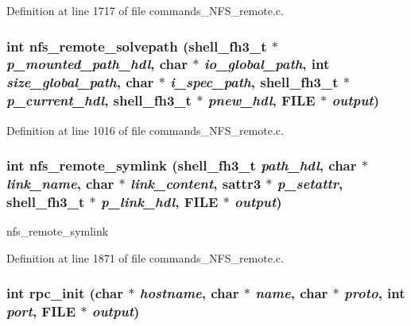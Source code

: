 Definition at line 1717 of file commands\_\-NFS\_\-remote.c.
\subsubsection[{nfs\_\-remote\_\-solvepath}]{\setlength{\rightskip}{0pt plus 5cm}int nfs\_\-remote\_\-solvepath ({\bf shell\_\-fh3\_\-t} $\ast$ {\em p\_\-mounted\_\-path\_\-hdl}, \/  char $\ast$ {\em io\_\-global\_\-path}, \/  int {\em size\_\-global\_\-path}, \/  char $\ast$ {\em i\_\-spec\_\-path}, \/  {\bf shell\_\-fh3\_\-t} $\ast$ {\em p\_\-current\_\-hdl}, \/  {\bf shell\_\-fh3\_\-t} $\ast$ {\em pnew\_\-hdl}, \/  FILE $\ast$ {\em output})}\label{commands__NFS__remote_8c_aec76de1bc9fca9dd6d8661e5d132b4c}




Definition at line 1016 of file commands\_\-NFS\_\-remote.c.
\subsubsection[{nfs\_\-remote\_\-symlink}]{\setlength{\rightskip}{0pt plus 5cm}int nfs\_\-remote\_\-symlink ({\bf shell\_\-fh3\_\-t} {\em path\_\-hdl}, \/  char $\ast$ {\em link\_\-name}, \/  char $\ast$ {\em link\_\-content}, \/  sattr3 $\ast$ {\em p\_\-setattr}, \/  {\bf shell\_\-fh3\_\-t} $\ast$ {\em p\_\-link\_\-hdl}, \/  FILE $\ast$ {\em output})}\label{commands__NFS__remote_8c_1b8e00105d4699f52d15b3f241480a62}


nfs\_\-remote\_\-symlink 

Definition at line 1871 of file commands\_\-NFS\_\-remote.c.
\subsubsection[{rpc\_\-init}]{\setlength{\rightskip}{0pt plus 5cm}int rpc\_\-init (char $\ast$ {\em hostname}, \/  char $\ast$ {\em name}, \/  char $\ast$ {\em proto}, \/  int {\em port}, \/  FILE $\ast$ {\em output})}\label{commands__NFS__remote_8c_7319b04b764e4966b934daae93b0d0ec}


